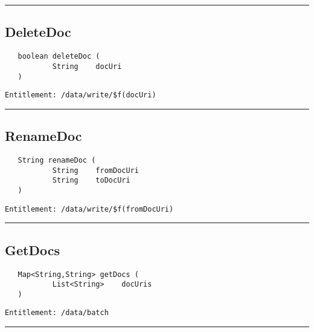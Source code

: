 \rule{12cm}{2pt}
\subsection{DeleteDoc}
\label{Api:DeleteDoc}
\begin{verbatim}
   boolean deleteDoc (
           String    docUri
   )
\end{verbatim}
\begin{Verbatim}[fontsize=\small, formatcom=\color{Maroon}]
  Entitlement: /data/write/$f(docUri)
\end{Verbatim}



\rule{12cm}{2pt}
\subsection{RenameDoc}
\label{Api:RenameDoc}
\begin{verbatim}
   String renameDoc (
           String    fromDocUri
           String    toDocUri
   )
\end{verbatim}
\begin{Verbatim}[fontsize=\small, formatcom=\color{Maroon}]
  Entitlement: /data/write/$f(fromDocUri)
\end{Verbatim}



\rule{12cm}{2pt}
\subsection{GetDocs}
\label{Api:GetDocs}
\begin{verbatim}
   Map<String,String> getDocs (
           List<String>    docUris
   )
\end{verbatim}
\begin{Verbatim}[fontsize=\small, formatcom=\color{Maroon}]
  Entitlement: /data/batch
\end{Verbatim}



\rule{12cm}{2pt}
